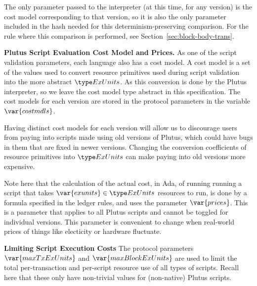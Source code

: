 The only parameter passed to the interpreter (at this time, for any version) is the cost model
corresponding to that version, so it is also the only parameter included
in the hash needed for this determinism-preserving comparison. For the rule
where this comparison is performed, see Section~\ref{sec:block-body-trans}.

\textbf{Plutus Script Evaluation Cost Model and Prices.}
As one of the script validation parameters, each language also has a
cost model. A cost model is a set of the values used to convert resource
primitives used during script validation into the
more abstract $\ExUnits$. As this conversion is done by the Plutus interpreter,
so we leave the cost model type abstract in this specification.
The cost models for each version are stored in the protocol
parameters in the variable $\var{costmdls}$.

Having distinct cost models for each version will allow us to discourage users from
paying into scripts made using old versions of Plutus, which could have bugs
in them that are fixed in newer versions. Changing the conversion coefficients
of resource primitives into $\ExUnits$ can make paying into old versions
more expensive.

Note here that the calculation of the actual cost, in Ada, of running
running a script that takes $\var{exunits} \in \ExUnits$ resources to run,
is done by a formula specified in the ledger rules, and uses the parameter
$\var{prices}$. This is a parameter that applies to all Plutus
scripts and cannot be toggled for individual versions. This parameter is
convenient to change when real-world prices of things like electicity or hardware
fluctuate.

\textbf{Limiting Script Execution Costs}
The protocol parameters $\var{maxTxExUnits}$ and $\var{maxBlockExUnits}$ are
used to limit the total per-transaction and per-script resource use of all
types of scripts. Recall here that these only have non-trivial values for
(non-native) Plutus scripts.

